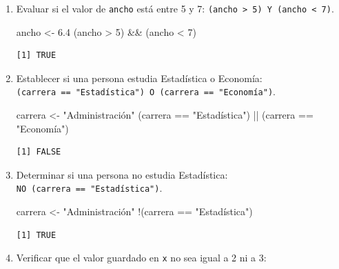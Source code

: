 \documentclass[
]{book}
\newenvironment{Shaded}{\begin{snugshade}}{\end{snugshade}}
\newcommand{\DecValTok}[1]{\textcolor[rgb]{0.00,0.00,0.81}{#1}}
\newcommand{\FloatTok}[1]{\textcolor[rgb]{0.00,0.00,0.81}{#1}}
\newcommand{\NormalTok}[1]{#1}
\newcommand{\OtherTok}[1]{\textcolor[rgb]{0.56,0.35,0.01}{#1}}
\newcommand{\SpecialCharTok}[1]{\textcolor[rgb]{0.00,0.00,0.00}{#1}}
\newcommand{\StringTok}[1]{\textcolor[rgb]{0.31,0.60,0.02}{#1}}
\begin{document}
\begin{enumerate}
\def\labelenumi{\arabic{enumi}.}
\item
  Evaluar si el valor de \texttt{ancho} está entre 5 y 7: \texttt{(ancho\ \textgreater{}\ 5)\ Y\ (ancho\ \textless{}\ 7)}.

\begin{Shaded}
\begin{Highlighting}[]
\NormalTok{ancho }\OtherTok{\textless{}{-}} \FloatTok{6.4}
\NormalTok{(ancho }\SpecialCharTok{\textgreater{}} \DecValTok{5}\NormalTok{) }\SpecialCharTok{\&\&}\NormalTok{ (ancho }\SpecialCharTok{\textless{}} \DecValTok{7}\NormalTok{)}
\end{Highlighting}
\end{Shaded}

\begin{verbatim}
[1] TRUE
\end{verbatim}
\item
  Establecer si una persona estudia Estadística o Economía: \texttt{(carrera\ ==\ "Estadística")\ O\ (carrera\ ==\ "Economía")}.

\begin{Shaded}
\begin{Highlighting}[]
\NormalTok{carrera }\OtherTok{\textless{}{-}} \StringTok{"Administración"}
\NormalTok{(carrera }\SpecialCharTok{==} \StringTok{"Estadística"}\NormalTok{) }\SpecialCharTok{||}\NormalTok{ (carrera }\SpecialCharTok{==} \StringTok{"Economía"}\NormalTok{)}
\end{Highlighting}
\end{Shaded}

\begin{verbatim}
[1] FALSE
\end{verbatim}
\item
  Determinar si una persona no estudia Estadística: \texttt{NO\ (carrera\ ==\ "Estadística")}.

\begin{Shaded}
\begin{Highlighting}[]
\NormalTok{carrera }\OtherTok{\textless{}{-}} \StringTok{"Administración"}
\SpecialCharTok{!}\NormalTok{(carrera }\SpecialCharTok{==} \StringTok{"Estadística"}\NormalTok{)}
\end{Highlighting}
\end{Shaded}

\begin{verbatim}
[1] TRUE
\end{verbatim}
\item
  Verificar que el valor guardado en \texttt{x} no sea igual a 2 ni a 3:


\end{enumerate}
\end{document}
